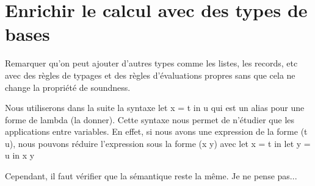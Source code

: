 \section{Enrichir le calcul avec des types de bases}

Remarquer qu'on peut ajouter d'autres types comme les listes, les records,
etc avec des règles de typages et des règles d'évaluations propres sans que
cela ne change la propriété de soundness.

Nous utiliserons dans la suite la syntaxe
let x = t in u qui est un alias pour une forme de lambda (la donner).
Cette syntaxe nous permet de n'étudier que les applications entre variables.
En effet, si nous avons une expression de la forme (t u), nous pouvons réduire
l'expression sous la forme (x y) avec
let x = t in
let y = u in
x y

Cependant, il faut vérifier que la sémantique reste la même. Je ne pense pas...